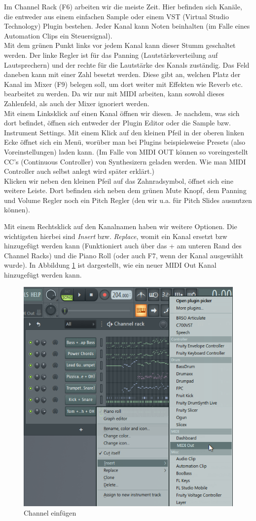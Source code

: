 Im Channel Rack (F6) arbeiten wir die meiste Zeit. Hier befinden sich Kanäle, die entweder aus einem einfachen Sample oder einem VST (Virtual Studio Technology) Plugin bestehen. Jeder Kanal kann Noten beinhalten (im Falle eines Automation Clips ein Steuersignal). \\
Mit dem grünen Punkt links vor jedem Kanal kann dieser Stumm geschaltet werden. Der linke Regler ist für das Panning (Lautstärkeverteilung auf Lautsprechern) und der rechte für die Lautstärke des Kanals zuständig. Das Feld daneben kann mit einer Zahl besetzt werden. Diese gibt an, welchen Platz der Kanal im Mixer (F9) belegen soll, um dort weiter mit Effekten wie Reverb etc. bearbeitet zu werden. Da wir nur mit MIDI arbeiten, kann sowohl dieses Zahlenfeld, als auch der Mixer ignoriert werden. \\
Mit einem Linksklick auf einen Kanal öffnen wir diesen. Je nachdem, was sich dort befindet, öffnen sich entweder der Plugin Editor oder die Sample bzw. Instrument Settings. Mit einem Klick auf den kleinen Pfeil in der oberen linken Ecke öffnet sich ein Menü, worüber man bei Plugins  beispielsweise Presets (also Voreinstellungen) laden kann. (Im Falle von MIDI OUT können so voreingestellt CC's (Continuous Controller) von Synthesizern geladen werden. Wie man MIDI Controller auch selbst anlegt wird später erklärt.) \\
Klicken wir neben den kleinen Pfeil auf das Zahnradsymbol, öffnet sich eine weitere Leiste. Dort befinden sich neben dem grünen Mute Knopf, dem Panning und Volume Regler noch ein Pitch Regler (den wir u.a. für Pitch Slides ausnutzen können).

\bigskip

Mit einem Rechtsklick auf den Kanalnamen haben wir weitere Optionen. Die wichtigsten hierbei sind \textit{Insert} bzw. \textit{Replace}, womit ein Kanal ersetzt bzw hinzugefügt werden kann (Funktioniert auch über das + am unteren Rand des Channel Racks) und die Piano Roll (oder auch F7, wenn der Kanal ausgewählt wurde). In Abbildung \ref{Channel} ist dargestellt, wie ein neuer MIDI Out Kanal hinzugefügt werden kann.


\begin{figure}[htbp] \centering
	\includegraphics[width=.70\linewidth]{images/Channel.png}
	\caption{Channel einfügen}
	\label{Channel}
\end{figure}


